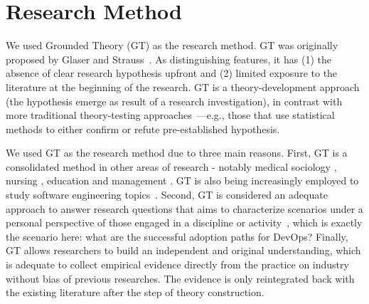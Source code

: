 \section{Research Method} \label{sec:research_method}

We used Grounded Theory (GT) as the research method. GT was
originally proposed by Glaser and Strauss~\cite{glase1967discovery}.
As distinguishing features, it has (1) the absence of clear research hypothesis upfront
and (2) limited exposure to the literature at the beginning of the research. GT
is a theory-development approach (the hypothesis emerge as result of
a research investigation), in contrast with more traditional
theory-testing approaches~\cite{coleman2007using}---e.g., those that
use statistical methods to either confirm or refute pre-established hypothesis.


We used GT as the research method due to three main reasons. First, GT is a consolidated
method in other areas of research - notably medical
sociology \cite{gt_medical_sociology}, nursing \cite{gt_nursing}, education
\cite{gt_education} and management \cite{gt_management}. GT is also being increasingly employed
to study software engineering topics~\cite{hoda2017becoming,stol2016grounded,Waterman:2015:ICSE}. Second,
GT is considered an adequate approach to answer research questions that aims to
characterize scenarios under a personal perspective of those
engaged in a discipline or activity~\cite{barnsteiner2002using},
which is exactly the scenario here: what are the successful adoption paths for DevOps? Finally,
GT allows researchers to build an independent and original understanding,
which is adequate to collect empirical evidence directly from the
practice on industry without bias of previous researches. The evidence
is only reintegrated back with the existing literature after the step of
theory construction.

